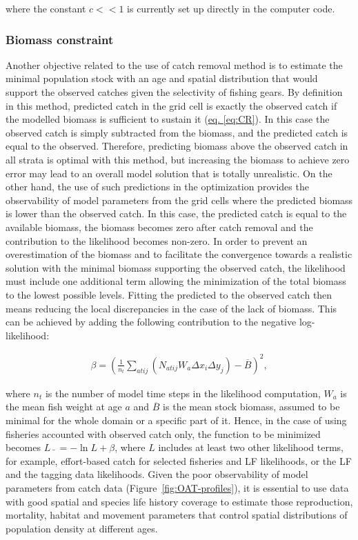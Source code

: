 \noindent where the constant $c<<1$ is currently set up directly in the computer code. 

\subsubsection{Biomass constraint}\label{sec:beta-like}

Another objective related to the use of catch removal method is to estimate the minimal population stock with an age and spatial distribution that would support the observed catches given the selectivity of fishing gears. By definition in this method, predicted catch in the grid cell is exactly the observed catch if the modelled biomass is sufficient to sustain it (\hyperref[eq:CR]{eq. \ref*{eq:CR}}). In this case the observed catch is simply subtracted from the biomass, and the predicted catch is equal to the observed. Therefore, predicting biomass above the observed catch in all strata is optimal with this method, but increasing the biomass to achieve zero error may lead to an overall model solution that is totally unrealistic. On the other hand, the use of such predictions in the optimization provides the observability of model parameters from the grid cells where the predicted biomass is lower than the observed catch. In this case, the predicted catch is equal to the available biomass, the biomass becomes zero after catch removal and the contribution to the likelihood becomes non-zero. In order to prevent an overestimation of the biomass and to facilitate the convergence towards a realistic solution with the minimal biomass supporting the observed catch, the likelihood must include one additional term allowing the minimization of the total biomass to the lowest possible levels. Fitting the predicted to the observed catch then means reducing the local discrepancies in the case of the lack of biomass. This can be achieved by adding the following contribution to the negative log-likelihood:

\begin{align}\label{eq:beta-like}
\beta = \left(\frac{1}{n_t}\sum_{atij}\left(N_{atij}W_a\Delta x_i \Delta y_j\right) -
\overline{B}\right)^2,
\end{align}

\noindent where $n_t$ is the number of model time steps in the likelihood computation, $W_a$ is the mean fish weight at age $a$ and $\overline{B}$ is the mean stock biomass, assumed to be minimal for the whole domain or a specific part of it. Hence, in the case of using fisheries accounted with observed catch only, the function to be minimized becomes $L\bar{\text{ }}=-\ln L +\beta$, where $L$ includes at least two other likelihood terms, for example, effort-based catch for selected fisheries and LF likelihoods, or the LF and the tagging data likelihoods. Given the poor observability of model parameters from catch data (Figure~\ref{fig:OAT-profiles}), it is essential to use data with good spatial and species life history coverage to estimate those reproduction, mortality, habitat and movement parameters that control spatial distributions of population density at different ages. 


